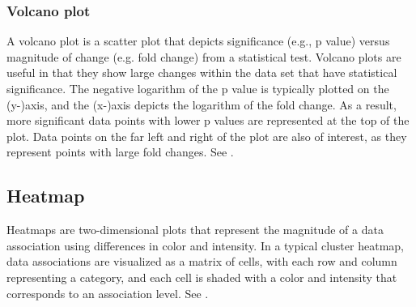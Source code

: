 \documentclass[AMA,LATO1COL]{WileyNJD-v2}
\begin{document}
\begin{figure}
    \centering
\end{figure}

\subsubsection{Volcano plot}


A volcano plot is a  scatter plot that depicts significance
(e.g., p value) versus magnitude of change (e.g. fold change) from a statistical
test. Volcano plots are useful in that they show large changes within the data
set that have statistical significance. The negative logarithm of the p value is
typically plotted on the  (y-)axis, and the
 (x-)axis depicts the logarithm of the fold change. As a
result, more significant data points with lower p values are represented at the
top of the plot. Data points on the far left and right of the plot are also of
interest, as they represent points with large fold changes. See .

\begin{figure}
    \centering
\end{figure}

\subsection{Heatmap}

Heatmaps are two-dimensional plots that represent the magnitude of a data
association using differences in color and intensity. In a typical cluster
heatmap, data associations are visualized as a matrix of cells, with each row
and column representing a category, and each cell is shaded with a color and
intensity that corresponds to an association level. See .

\begin{figure}
    \centering
\end{figure}
\end{document}
